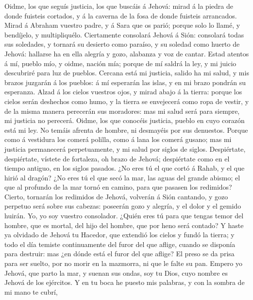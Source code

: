  Oidme, los que seguís justicia, los que buscáis á Jehová:
mirad á la piedra de donde fuisteis cortados, y á la caverna de la fosa
de donde fuisteis arrancados.  Mirad á Abraham vuestro
padre, y á Sara que os parió; porque solo lo llamé, y bendíjelo, y
multipliquélo.  Ciertamente consolará Jehová á Sión:
consolará todas sus soledades, y tornará su desierto como paraíso, y su
soledad como huerto de Jehová: hallarse ha en ella alegría y gozo,
alabanza y voz de cantar.  Estad atentos á mí, pueblo mío,
y oidme, nación mía; porque de mí saldrá la ley, y mi juicio descubriré
para luz de pueblos.  Cercana está mi justicia, salido ha
mi salud, y mis brazos juzgarán á los pueblos: á mí esperarán las islas,
y en mi brazo pondrán su esperanza.  Alzad á los cielos
vuestros ojos, y mirad abajo á la tierra: porque los cielos serán
deshechos como humo, y la tierra se envejecerá como ropa de vestir, y de
la misma manera perecerán sus moradores: mas mi salud será para siempre,
mi justicia no perecerá.  Oidme, los que conocéis
justicia, pueblo en cuyo corazón está mi ley. No temáis afrenta de
hombre, ni desmayéis por sus denuestos.  Porque como á
vestidura los comerá polilla, como á lana los comerá gusano; mas mi
justicia permanecerá perpetuamente, y mi salud por siglos de siglos.
 Despiértate, despiértate, vístete de fortaleza, oh brazo
de Jehová; despiértate como en el tiempo antiguo, en los siglos pasados.
¿No eres tú el que cortó á Rahab, y el que hirió al dragón?
 ¿No eres tú el que secó la mar, las aguas del grande
abismo; el que al profundo de la mar tornó en camino, para que pasasen
los redimidos?  Cierto, tornarán los redimidos de Jehová,
volverán á Sión cantando, y gozo perpetuo será sobre sus cabezas:
poseerán gozo y alegría, y el dolor y el gemido huirán. 
Yo, yo soy vuestro consolador. ¿Quién eres tú para que tengas temor del
hombre, que es mortal, del hijo del hombre, que por heno será contado?
 Y haste ya olvidado de Jehová tu Hacedor, que extendió
los cielos y fundó la tierra; y todo el día temiste continuamente del
furor del que aflige, cuando se disponía para destruir: mas ¿en dónde
está el furor del que aflige?  El preso se da prisa para
ser suelto, por no morir en la mazmorra, ni que le falte su pan.
 Empero yo Jehová, que parto la mar, y suenan sus ondas,
soy tu Dios, cuyo nombre es Jehová de los ejércitos.  Y
en tu boca he puesto mis palabras, y con la sombra de mi mano te cubrí,
